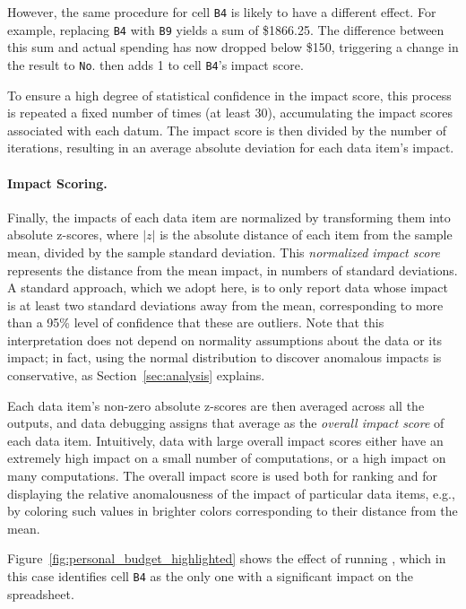 However, the same procedure for cell \texttt{B4} is likely to have a
different effect.  For example, replacing \texttt{B4}
with \texttt{B9} yields a sum of \$1866.25. The difference
between this sum and actual spending has now dropped below \$150,
triggering a change in the result to \texttt{No}. \checkcell{} then
adds 1 to cell \texttt{B4}'s impact score.


To ensure a high degree of statistical confidence in the impact score,
this process is repeated a fixed number of times (at least 30),
accumulating the impact scores associated with each datum. The impact
score is then divided by the number of iterations, resulting in an
average absolute deviation for each data item's impact.

\paragraph{Impact Scoring.}
Finally, the impacts of each data item are normalized by transforming
them into absolute z-scores, where $|z|$ is the absolute distance of
each item from the sample mean, divided by the sample standard
deviation. This \emph{normalized impact score} represents the distance
from the mean impact, in numbers of standard deviations. A standard
approach, which we adopt here, is to only report data whose impact is
at least two standard deviations away from the mean, corresponding to
more than a 95\% level of confidence that these are outliers.  Note
that this interpretation does not depend on normality assumptions
about the data or its impact; in fact, using the normal distribution
to discover anomalous impacts is conservative, as
Section~\ref{sec:analysis} explains.

Each data item's non-zero absolute z-scores are then averaged across
all the outputs, and data debugging assigns that average as the
\emph{overall impact score} of each data item. Intuitively, data with
large overall impact scores either have an extremely high impact on a
small number of computations, or a high impact on many
computations. The overall impact score is used both for ranking and
for displaying the relative anomalousness of the impact of particular
data items, e.g., by coloring such values in brighter colors
corresponding to their distance from the mean.

Figure~\ref{fig:personal_budget_highlighted} shows the effect of
running \checkcell{}, which in this case identifies cell \texttt{B4}
as the only one with a significant impact on the spreadsheet.

